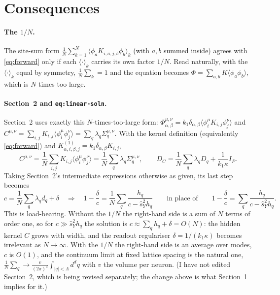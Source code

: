 \documentclass[11pt,a4paper]{article}
\begin{document}
\section{Consequences}

\paragraph{The $1/N$.}
The site-sum form $\frac1N\sum_{k=1}^N\langle\phi_aK_{i,a,j,b}\phi_b\rangle_k$
(with $a,b$ summed inside) agrees with \eqref{eq:forward} only if each
$\langle\cdot\rangle_k$ carries its own factor $1/N$. Read naturally, with the
$\langle\cdot\rangle_k$ equal by symmetry, $\frac1N\sum_k = 1$ and the
equation becomes $\Phi = \sum_{a,b}K\langle\phi_a\phi_b\rangle$, which is $N$
times too large.

\paragraph{Section~2 and \texttt{eq:linear-soln}.}
Section~2 uses exactly this $N$-times-too-large form:
$\Phi^{\mu,\nu}_{\alpha,\beta} = k_1\delta_{\alpha,\beta}\langle\phi^\mu_iK_{i,j}\phi^\nu_j\rangle$
and $C^{\mu,\nu} = \sum_{i,j}K_{i,j}\langle\phi^\mu_i\phi^\nu_j\rangle = \sum_q\lambda_q\Sigma^{\mu,\nu}_q$.
With the kernel definition (equivalently \eqref{eq:forward}) and
$K^{(1)}_{\alpha,i,\beta,j} = k_1\delta_{\alpha,\beta}K_{i,j}$,
\begin{equation}
  C^{\mu,\nu} = \frac1N\sum_{i,j}K_{i,j}\langle\phi^\mu_i\phi^\nu_j\rangle
  = \frac1N\sum_q\lambda_q\Sigma^{\mu,\nu}_q,
  \qquad
  D_C = \frac1N\sum_q\lambda_qD_q + \frac1{k_1\kappa}I_P .
\end{equation}
Taking Section~2's intermediate expressions otherwise as given, its last step
becomes
\begin{equation}
  c = \frac1N\sum_q\lambda_qd_q + \delta
  \quad\Longrightarrow\quad
  1 - \frac\delta c = \frac1N\sum_q\frac{h_q}{c - \hat s_Y^2h_q}
  \qquad\text{in place of}\qquad
  1 - \frac\delta c = \sum_q\frac{h_q}{c - \hat s_Y^2h_q}.
\end{equation}
This is load-bearing. Without the $1/N$ the right-hand side is a sum of $N$
terms of order one, so for $c\gg\hat s_Y^2h_q$ the solution is
$c\approx\sum_qh_q+\delta = O(N)$: the hidden kernel $C$ grows with width, and
the readout regulariser $\delta = 1/(k_1\kappa)$ becomes irrelevant as
$N\to\infty$. With the $1/N$ the right-hand side is an average over modes, $c$
is $O(1)$, and the continuum limit at fixed lattice spacing is the natural one,
$\frac1N\sum_q \to \frac{v}{(2\pi)^d}\int_{|q|<\Lambda}d^dq$ with $v$ the volume
per neuron. (I have not edited Section~2, which is being revised separately;
the change above is what Section~1 implies for it.)
\end{document}
